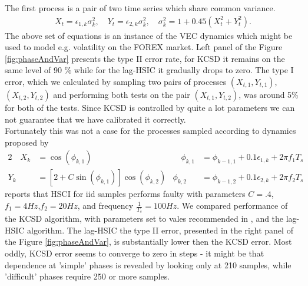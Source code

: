 \documentclass{article} %
\begin{document}
The first process is a pair of two time series which share common variance.   
\begin{align}
\label{eq:dynamics2}
 X_t = \epsilon_{1,k} \sigma_k^2, \quad  Y_t = \epsilon_{2,k}  \sigma_k^2,  \quad \sigma_k^2 = 1 + 0.45(X_t^2 + Y_t^2 ).
\end{align}
The above set of equations is an instance of the VEC dynamics \cite{bauwens_multivariate_2006} which might be used to model e.g. volatility on the FOREX market. Left panel of the Figure \ref{fig:phaseAndVar} presents the type II error rate, for KCSD it remains on the same level of 90 \% while for  the lag-HSIC it gradually drops to zero. The type I error, which we calculated by sampling two pairs of processes $(X_{t,1},Y_{t,1})$, $(X_{t,2},Y_{t,2})$ and performing both tests on the pair $(X_{t,1},Y_{t,2})$, was around 5\% for both of the tests. Since KCSD is controlled by quite a lot parameters we can not guarantee that we have calibrated it correctly. \\
Fortunately this was not a case for the processes sampled according to dynamics proposed by \cite{besserve_statistical_2013}      
\begin{alignat}{2}
  \quad X_k &= \cos(\phi_{k,1})   &\quad  \phi_{k,1} &= \phi_{k-1,1} + 0.1\epsilon_{1,k} + 2 \pi f_1 T_s \label{eg:dymamics1a} \\  
  Y_k &= [2+C\sin(\phi_{k,1})]\cos(\phi_{k,2})  &   \phi_{k,2} &= \phi_{k-1,2} + 0.1\epsilon_{2,k} + 2 \pi f_2 T_s \label{eg:dymamics1b}
\end{alignat}
 \cite{besserve_statistical_2013} reports that HSCI for iid samples performs faulty with parameters $C=.4$, $f_1=4Hz$,$f_2=20Hz$, and frequency $\frac {1} {T_s} = 100 Hz$. We compared performance of the KCSD algorithm, with parameters set to vales recommended in \cite{besserve_statistical_2013}, and the lag-HSIC algorithm. The lag-HSIC the type II error, presented in the right panel of the  Figure \ref{fig:phaseAndVar}, is substantially lower then the KCSD error. Most oddly, KCSD error seems to converge to zero in steps - it might be that dependence at 'simple' phases is revealed by looking only at 210 samples, while 'difficult'  phases require 250 or more samples.   
 
\end{document}
